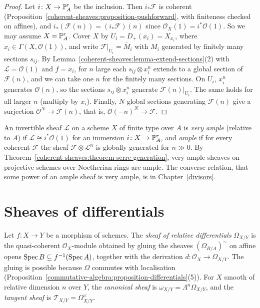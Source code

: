 \begin{proof}
Let $i \colon X \to \mathbb{P}^r_A$ be the inclusion. Then $i_*\mathcal{F}$ is coherent (Proposition~\ref{coherent-sheaves:proposition-pushforward}, with
finiteness checked on affines), and $i_*(\mathcal{F}(n)) = (i_*\mathcal{F})(n)$ since $\mathcal{O}_X(1) = i^*\mathcal{O}(1)$. So we may assume $X = \mathbb{P}^r_A$. Cover
$X$ by $U_i = D_+(x_i) = X_{x_i}$, where $x_i \in \Gamma(X, \mathcal{O}(1))$, and write $\mathcal{F}|_{U_i} = \widetilde{M_i}$ with $M_i$ generated by finitely
many sections $s_{ij}$. By Lemma~\ref{coherent-sheaves:lemma-extend-sections}(2) with $\mathcal{L} = \mathcal{O}(1)$ and $f = x_i$, for $n$ large each
$s_{ij} \otimes x_i^n$ extends to a global section of $\mathcal{F}(n)$, and we can take one $n$ for the finitely many sections. On $U_i$, $x_i^n$ generates
$\mathcal{O}(n)$, so the sections $s_{ij} \otimes x_i^n$ generate $\mathcal{F}(n)|_{U_i}$. The same holds for all larger $n$ (multiply by $x_i$). Finally, $N$ global
sections generating $\mathcal{F}(n)$ give a surjection $\mathcal{O}^N \to \mathcal{F}(n)$, that is, $\mathcal{O}(-n)^N \to \mathcal{F}$.
\end{proof}

\begin{definition}\label{coherent-sheaves:definition-very-ample}
An invertible sheaf $\mathcal{L}$ on a scheme $X$ of finite type over $A$ is \emph{very ample} (relative to $A$) if $\mathcal{L} \cong i^*\mathcal{O}(1)$ for an
immersion $i \colon X \to \mathbb{P}^r_A$, and \emph{ample} if for every coherent $\mathcal{F}$ the sheaf $\mathcal{F} \otimes \mathcal{L}^n$ is globally generated for
$n \gg 0$. By Theorem~\ref{coherent-sheaves:theorem-serre-generation}, very ample sheaves on projective schemes over Noetherian rings are ample. The
converse relation, that some power of an ample sheaf is very ample, is in Chapter~\ref{divisors}.
\end{definition}

\section{Sheaves of differentials}\label{coherent-sheaves:section-differentials}

\begin{definition}\label{coherent-sheaves:definition-differentials}
Let $f \colon X \to Y$ be a morphism of schemes. The \emph{sheaf of relative differentials} $\Omega_{X/Y}$ is the quasi-coherent $\mathcal{O}_X$-module
obtained by gluing the sheaves $(\Omega_{B/A})^\sim$ on affine opens $\operatorname{Spec} B \subseteq f^{-1}(\operatorname{Spec} A)$, together with the derivation
$d \colon \mathcal{O}_X \to \Omega_{X/Y}$. The gluing is possible because $\Omega$ commutes with localisation
(Proposition~\ref{commutative-algebra:proposition-differentials}(5)). For $X$ smooth of relative dimension $n$ over $Y$, the \emph{canonical sheaf} is
$\omega_{X/Y} = \Lambda^n\Omega_{X/Y}$, and the \emph{tangent sheaf} is $\mathcal{T}_{X/Y} = \Omega_{X/Y}^\vee$.
\end{definition}

